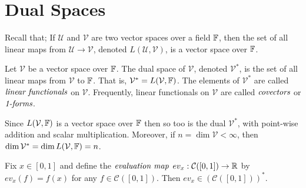 
\section{Dual Spaces} %
\label{sec:dualspace}

Recall that; If $\mathcal{U}$ and $\mathcal{V}$ are two
vector spaces over a field $\mathbb{F}$, then the set of all
linear maps from $\mathcal{U} \to \mathcal{V}$, denoted
$L(\mathcal{U},\mathcal{V})$, is a vector space over $\mathbb{F}$.

\begin{defn}
	Let $\mathcal{V}$ be a vector space over $\mathbb{F}$. The dual
	space of $\mathcal{V}$, denoted $\mathcal{V}^{*}$, is
	the set of all linear maps from $\mathcal{V}$ to $\mathbb{F}$.
	That is, $\mathcal{V}^{*} = L(\mathcal{V},\mathbb{F})$.
	The elements of $\mathcal{V}^{*}$ are called
	$\emph{linear functionals}$ on $\mathcal{V}$.
	Frequently, linear functionals on $\mathcal{V}$ are
	called $\emph{covectors}$ or $\emph{1-forms}$.
\end{defn}

\begin{rem}
	Since $L(\mathcal{V},\mathbb{F})$ is a vector space over $\mathbb{F}$ then
	so too is the dual $\mathcal{V}^{*}$, with point-wise addition and
	scalar multiplication. Moreover, if $n=\dim \mathcal{V} < \infty$,
	then $\dim \mathcal{V}^{*} = \dim L(\mathcal{V},\mathbb{F}) = n$.
\end{rem}

\begin{exmp}
	Fix $x \in [0,1]$ and define the $\emph{evaluation map}$
	$ev_x : \mathcal{C}([0,1]) \to \mathbb{R}$ by $ev_x (f) = f(x)$ for any
	$f \in \mathcal{C}([0,1])$.
	Then $ev_x \in \left( \mathcal{C}([0,1]) \right)^{*}$.
\end{exmp}
